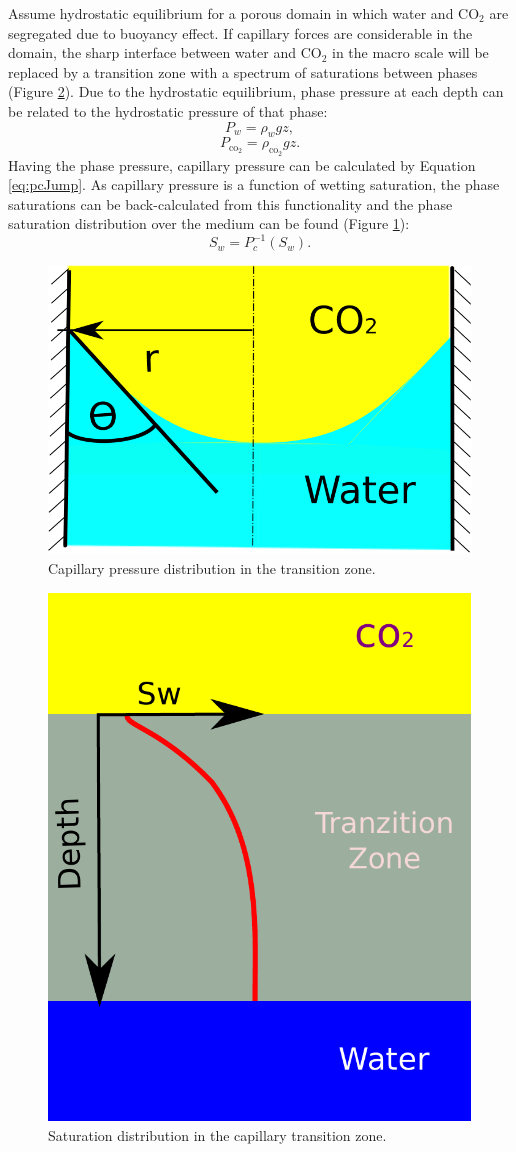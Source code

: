 Assume hydrostatic equilibrium for a porous domain in which water and
$\mbox{CO}_2$ are segregated due to buoyancy effect.  If capillary forces
are considerable in the domain, the sharp interface between water and
$\mbox{CO}_2$ in the macro scale will be replaced by a transition zone with a
spectrum of saturations between phases (Figure \ref{fig:TZ}). Due to the
hydrostatic equilibrium, phase pressure at each depth can be related to the
hydrostatic pressure of that phase:
\begin{equation}
 P_w=\rho_wgz
 \label{eq:rghw},
\end{equation}
\begin{equation}
 P_{\mbox{co}_2}=\rho_{\mbox{co}_2}gz
 \label{eq:rghc}.
\end{equation} Having the phase pressure, capillary pressure can be calculated
by
Equation  \ref{eq:pcJump}. As capillary pressure is a function of wetting
saturation, the phase saturations can be back-calculated from this functionality
and the phase saturation distribution over the medium can be found (Figure
\ref{fig:PC}):
\begin{equation}
 S_w = P_c^{-1}(S_w).
 \label{eq:pc-1}
\end{equation}



\begin{figure}
 \centering{}
 \includegraphics[width=0.35\linewidth]{./figurer/pipe}
 \caption{Capillary pressure distribution in the transition zone.}
 \label{fig:PC}
\end{figure}

\begin{figure}[thb]
 \centering{}
 \includegraphics[width=0.35\linewidth]{./figurer/pch}
 \caption{Saturation distribution in the capillary transition zone.}
 \label{fig:TZ}
\end{figure}



